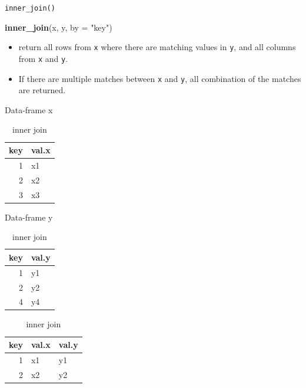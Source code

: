 \documentclass[ignorenonframetext,]{beamer}
\newenvironment{Shaded}{\begin{snugshade}}{\end{snugshade}}
\newcommand{\KeywordTok}[1]{\textcolor[rgb]{0.13,0.29,0.53}{\textbf{#1}}}
\newcommand{\DataTypeTok}[1]{\textcolor[rgb]{0.13,0.29,0.53}{#1}}
\newcommand{\StringTok}[1]{\textcolor[rgb]{0.31,0.60,0.02}{#1}}
\newcommand{\NormalTok}[1]{#1}
\providecommand{\tightlist}{%
  \setlength{\itemsep}{0pt}\setlength{\parskip}{0pt}}
\let\oldShaded\Shaded
\let\endoldShaded\endShaded
\renewenvironment{Shaded}{\footnotesize\oldShaded}{\endoldShaded}
\begin{document}
\begin{frame}[fragile]{\texttt{inner\_join()}}

\begin{Shaded}
\begin{Highlighting}[]
\KeywordTok{inner_join}\NormalTok{(x, y, }\DataTypeTok{by =} \StringTok{"key"}\NormalTok{)}
\end{Highlighting}
\end{Shaded}

\begin{itemize}
\tightlist
\item
  return all rows from \texttt{x} where there are matching values in
  \texttt{y}, and all columns from \texttt{x} and \texttt{y}.
\item
  If there are multiple matches between \texttt{x} and \texttt{y}, all
  combination of the matches are returned.
\end{itemize}

\begin{table}[!htb]
    \begin{minipage}{.33\linewidth}
      \caption*{Data-frame x}
      \centering 
\begin{tabular}{rl}
\toprule
key & val.x\\
\midrule
1 & x1\\
2 & x2\\
3 & x3\\
\bottomrule
\end{tabular} \end{minipage}%
    \begin{minipage}{.33\linewidth}
      \centering
        \caption*{Data-frame y} 
\begin{tabular}{rl}
\toprule
key & val.y\\
\midrule
1 & y1\\
2 & y2\\
4 & y4\\
\bottomrule
\end{tabular} \end{minipage}%
    \begin{minipage}{.33\linewidth}
      \centering
        \caption*{inner join} 
\begin{tabular}{rll}
\toprule
key & val.x & val.y\\
\midrule
1 & x1 & y1\\
2 & x2 & y2\\
\bottomrule
\end{tabular} \end{minipage} 
\end{table}

\end{frame}
\end{document}
